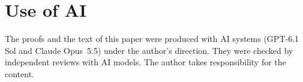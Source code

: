 \documentclass[11pt]{article}
\theoremstyle{definition}
\theoremstyle{remark}
\numberwithin{equation}{section}
\begin{document}



\section*{Use of AI}
The proofs and the text of this paper were produced with AI systems (GPT-6.1 Sol and Claude Opus~5.5) under
the author's direction. They were checked by independent reviews with AI models. The author takes
responsibility for the content.
\end{document}
